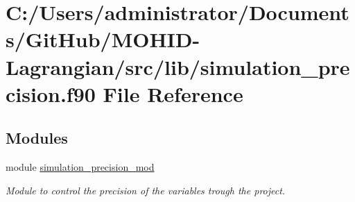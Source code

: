 \hypertarget{simulation__precision_8f90}{}\section{C\+:/\+Users/administrator/\+Documents/\+Git\+Hub/\+M\+O\+H\+I\+D-\/\+Lagrangian/src/lib/simulation\+\_\+precision.f90 File Reference}
\label{simulation__precision_8f90}
\subsection*{Modules}
\begin{DoxyCompactItemize}
\item 
module \hyperlink{namespacesimulation__precision__mod}{simulation\+\_\+precision\+\_\+mod}
\begin{DoxyCompactList}\small\item\em Module to control the precision of the variables trough the project. \end{DoxyCompactList}\end{DoxyCompactItemize}
